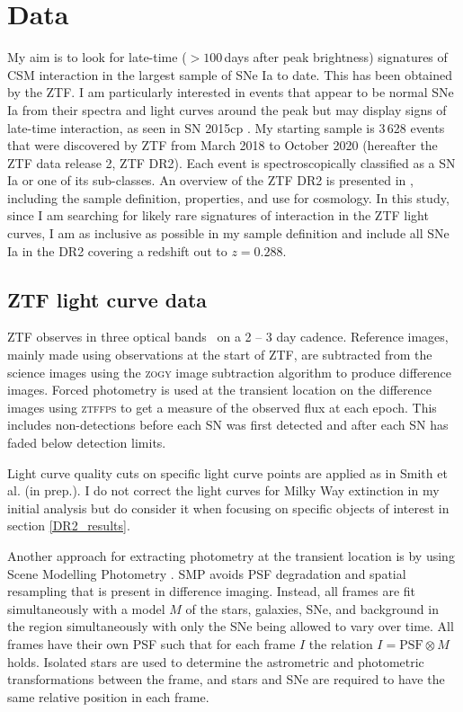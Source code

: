\documentclass[a4paper,oneside,12pt, class=Latex/Classes/PhDthesisPSnPDF, crop=false]{standalone}
\begin{document}
\section{Data}
\label{DR2_data}
My aim is to look for late-time ($>100$\,days after peak brightness) signatures of CSM interaction in the largest sample of SNe Ia to date. This has been obtained by the ZTF. I am particularly interested in events that appear to be normal SNe Ia from their spectra and light curves around the peak but may display signs of late-time interaction, as seen in SN 2015cp \citep{2015cp}. My starting sample is 3\,628 events that were discovered by ZTF from March 2018 to October 2020 (hereafter the ZTF data release 2, ZTF DR2). Each event is spectroscopically classified as a SN Ia or one of its sub-classes. An overview of the ZTF DR2 is presented in \citet{DR2_Overview}, including the sample definition, properties, and use for cosmology. In this study, since I am searching for likely rare signatures of interaction in the ZTF light curves, I am as inclusive as possible in my sample definition and include all SNe Ia in the DR2 covering a redshift out to $z = 0.288$. 

\subsection{ZTF light curve data}
\label{lc_data}
ZTF observes in three optical bands \ztfg\ztfr\ztfi\ on a 2 -- 3 day cadence. Reference images, mainly made using observations at the start of ZTF, are subtracted from the science images using the \textsc{zogy} image subtraction algorithm \citep{ZOGY} to produce difference images. Forced photometry is used at the transient location on the difference images using \textsc{ztffps} \citep{ztffps} to get a measure of the observed flux at each epoch. This includes non-detections before each SN was first detected and after each SN has faded below detection limits.

Light curve quality cuts on specific light curve points are applied as in Smith et al. (in prep.). I do not correct the light curves for Milky Way extinction in my initial analysis but do consider it when focusing on specific objects of interest in section \ref{DR2_results}. 

Another approach for extracting photometry at the transient location is by using Scene Modelling Photometry \citep[SMP;][]{Holtzmann_SMP}. SMP avoids PSF degradation and spatial resampling that is present in difference imaging. Instead, all frames are fit simultaneously with a model $M$ of the stars, galaxies, SNe, and background in the region simultaneously with only the SNe being allowed to vary over time. All frames have their own PSF such that for each frame $I$ the relation $I = \text{PSF}\otimes M$ holds. Isolated stars are used to determine the astrometric and photometric transformations between the frame, and stars and SNe are required to have the same relative position in each frame.
\end{document}
